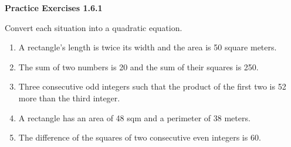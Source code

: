 \vspace{1ex}
\noindent\textbf{Practice Exercises 1.6.1}

\vspace{0.75ex}

Convert each situation into a quadratic equation. 

\begin{enumerate}[label = \color{blue}\arabic*. ]
\item A rectangle's length is twice its width and the area is 50 square meters. 
\item The sum of two numbers is 20 and the sum of their squares is 250.
\item Three consecutive odd integers such that the product of the first two is 52 more than the third integer. 
\item A rectangle has an area of 48 sqm and a perimeter of 38 meters. 
\item The difference of the squares of two consecutive even integers is 60.
\end{enumerate}


